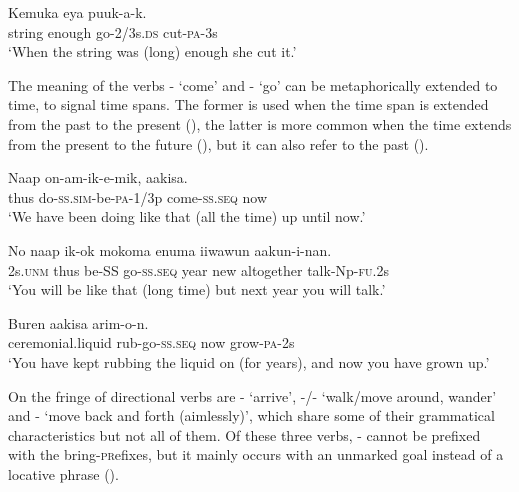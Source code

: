 \ea%
\label{ex:x289}
\gll Kemuka  eya puuk-a-k. \\
string enough go-2/3s.\textsc{ds} cut-\textsc{pa}-3s \\
\glt`When the string was (long) enough she cut it.'
\z

The meaning of the verbs - `come' and - `go' can be metaphorically extended to time, to signal time spans. The former is used when the time span is extended from the past to the present (), the latter is more common when the time extends from the present to the future (), but it can also refer to the past ().

\ea%
\label{ex:x290}
\gll Naap on-am-ik-e-mik,   aakisa. \\
thus do-\textsc{ss}.\textsc{sim}-be-\textsc{pa}-1/3p come-\textsc{ss}.\textsc{seq} now\\
\glt`We have been doing like that (all the time) up until now.'
\z

\ea%
\label{ex:x437}
\gll No naap ik-ok  mokoma enuma iiwawun aakun-i-nan.\\
2s.\textsc{unm} thus be-SS go-\textsc{ss}.\textsc{seq} year new altogether talk-Np-\textsc{fu}.2s\\
\glt`You will be like that (long time) but next year you will talk.'
\z

\ea%
\label{ex:x291}
\gll Buren \textstyleEmphasizedVernacularWords{(}\textstyleEmphasizedVernacularWords{)} aakisa arim-o-n. \\
ceremonial.liquid rub-go-\textsc{ss}.\textsc{seq} now grow-\textsc{pa}-2s \\
\glt`You have kept rubbing the \textit{} liquid on (for years), and now you have grown up.'
\z

On the fringe of directional verbs are - `arrive', -/- `walk/move around, wander' and - `move back and forth (aimlessly)', which share some of their grammatical characteristics but not all of them. Of these three verbs, - cannot be prefixed with the bring-\textsc{pr}efixes, but it mainly occurs with an unmarked goal instead of a locative phrase ().

